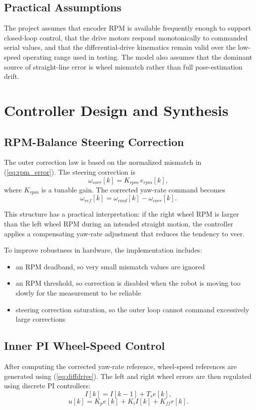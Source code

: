 \documentclass[conference]{IEEEtran}
\begin{document}
\subsection{Practical Assumptions}
The project assumes that encoder RPM is available frequently enough to support closed-loop control, that the drive motors respond monotonically to commanded serial values, and that the differential-drive kinematics remain valid over the low-speed operating range used in testing. The model also assumes that the dominant source of straight-line error is wheel mismatch rather than full pose-estimation drift.

\section{Controller Design and Synthesis}
\subsection{RPM-Balance Steering Correction}
The outer correction law is based on the normalized mismatch in (\ref{eq:rpm_error}). The steering correction is
\begin{equation}
\omega_{corr}[k] = K_{rpm}\,e_{rpm}[k],
\label{eq:omega_corr}
\end{equation}
where $K_{rpm}$ is a tunable gain. The corrected yaw-rate command becomes
\begin{equation}
\omega_{ref}[k] = \omega_{cmd}[k] - \omega_{corr}[k].
\label{eq:omega_ref}
\end{equation}

This structure has a practical interpretation: if the right wheel RPM is larger than the left wheel RPM during an intended straight motion, the controller applies a compensating yaw-rate adjustment that reduces the tendency to veer.

To improve robustness in hardware, the implementation includes:
\begin{itemize}
\item an RPM deadband, so very small mismatch values are ignored
\item an RPM threshold, so correction is disabled when the robot is moving too slowly for the measurement to be reliable
\item steering correction saturation, so the outer loop cannot command excessively large corrections
\end{itemize}

\subsection{Inner PI Wheel-Speed Control}
After computing the corrected yaw-rate reference, wheel-speed references are generated using (\ref{eq:diffdrive}). The left and right wheel errors are then regulated using discrete PI controllers:
\begin{equation}
I[k] = I[k-1] + T_s e[k],
\end{equation}
\begin{equation}
u[k] = K_p e[k] + K_i I[k] + K_{ff}r[k].
\label{eq:pi}
\end{equation}
\end{document}
